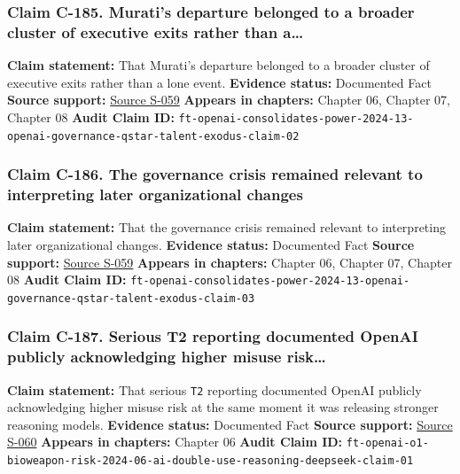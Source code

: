\documentclass[
  american,
  11pt,
  letterpaper,
]{article}
\begin{document}
\subsubsection{Claim C-185. Murati's departure belonged to a broader
cluster of executive exits rather than
a\ldots{}}\label{claim-c-185-murati-s-departure-belonged-to-a-broader-cluster-of-executive-exits-rather-than-a}

\textbf{Claim statement:} That Murati's departure belonged to a broader
cluster of executive exits rather than a lone event. \textbf{Evidence
status:} Documented Fact \textbf{Source support:}
\hyperref[source-s-059-who-s-left-at-openai-sam-altman-consolidates-power-after-failed-coup]{Source
S-059} \textbf{Appears in chapters:} Chapter 06, Chapter 07, Chapter 08
\textbf{Audit Claim ID:}
\texttt{ft-openai-consolidates-power-2024-13-openai-governance-qstar-talent-exodus-claim-02}

\subsubsection{Claim C-186. The governance crisis remained relevant to
interpreting later organizational
changes}\label{claim-c-186-the-governance-crisis-remained-relevant-to-interpreting-later-organizational-changes}

\textbf{Claim statement:} That the governance crisis remained relevant
to interpreting later organizational changes. \textbf{Evidence status:}
Documented Fact \textbf{Source support:}
\hyperref[source-s-059-who-s-left-at-openai-sam-altman-consolidates-power-after-failed-coup]{Source
S-059} \textbf{Appears in chapters:} Chapter 06, Chapter 07, Chapter 08
\textbf{Audit Claim ID:}
\texttt{ft-openai-consolidates-power-2024-13-openai-governance-qstar-talent-exodus-claim-03}

\subsubsection{Claim C-187. Serious T2 reporting documented OpenAI
publicly acknowledging higher misuse
risk\ldots{}}\label{claim-c-187-serious-t2-reporting-documented-openai-publicly-acknowledging-higher-misuse-risk}

\textbf{Claim statement:} That serious \texttt{T2} reporting documented
OpenAI publicly acknowledging higher misuse risk at the same moment it
was releasing stronger reasoning models. \textbf{Evidence status:}
Documented Fact \textbf{Source support:}
\hyperref[source-s-060-openai-acknowledges-new-models-increase-risk-of-misuse-to-create-bioweapons]{Source
S-060} \textbf{Appears in chapters:} Chapter 06 \textbf{Audit Claim ID:}
\texttt{ft-openai-o1-bioweapon-risk-2024-06-ai-double-use-reasoning-deepseek-claim-01}
\end{document}
